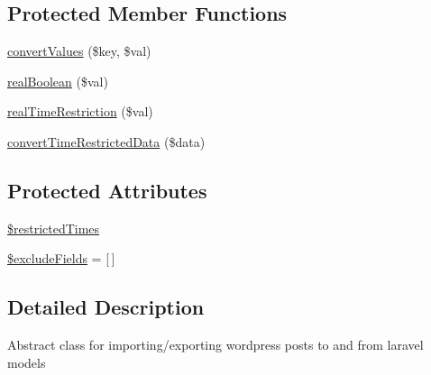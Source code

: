 \subsection*{Protected Member Functions}
\begin{DoxyCompactItemize}
\item 
\hyperlink{classDMA_1_1Friends_1_1Wordpress_1_1Post_a8969b8476b3ba0afc871532f6f936514}{convert\-Values} (\$key, \$val)
\item 
\hyperlink{classDMA_1_1Friends_1_1Wordpress_1_1Post_a37fb0931dadba67a39a637b336787663}{real\-Boolean} (\$val)
\item 
\hyperlink{classDMA_1_1Friends_1_1Wordpress_1_1Post_a5fbf4b003c2136d8497ddd7d726ad671}{real\-Time\-Restriction} (\$val)
\item 
\hyperlink{classDMA_1_1Friends_1_1Wordpress_1_1Post_a427b14dd99893217929ee8ee93977628}{convert\-Time\-Restricted\-Data} (\$data)
\end{DoxyCompactItemize}
\subsection*{Protected Attributes}
\begin{DoxyCompactItemize}
\item 
\hyperlink{classDMA_1_1Friends_1_1Wordpress_1_1Post_ac0b74792fa83b0a9dafda52eec451e50}{\$restricted\-Times}
\item 
\hyperlink{classDMA_1_1Friends_1_1Wordpress_1_1Post_ac9f76efeb858c94d5ab78e74b4301c16}{\$exclude\-Fields} = \mbox{[}$\,$\mbox{]}
\end{DoxyCompactItemize}


\subsection{Detailed Description}
Abstract class for importing/exporting wordpress posts to and from laravel models 

